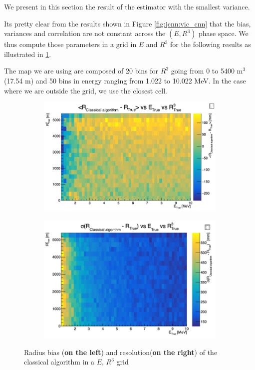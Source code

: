 \documentclass[../main.tex]{subfiles}
\begin{document}
We present in this section the result of the estimator with the smallest variance.

Its pretty clear from the results shown in Figure \ref{fig:jcnn:vic_cnn} that the bias, variances and correlation are not constant across the $(E, R^3)$ phase space. We thus compute those parameters in a grid in $E$ and $R^3$ for the following results as illustrated in \ref{fig:jcnn:vic_cnn:res_map}.

The map we are using are composed of 20 bins for $R^3$ going from 0 to 5400 m$^3$ (17.54 m) and 50 bins in energy ranging from 1.022 to 10.022 MeV. In the case where we are outside the grid, we use the closest cell.

\begin{figure}
  \centering
  \begin{subfigure}[t]{0.48\linewidth}
    \includegraphics[width=\linewidth]{images/jcnn/vic_cnn/vic_r_bias.png}
  \end{subfigure}
  \hfill
  \begin{subfigure}[t]{0.48\linewidth}
    \includegraphics[width=\linewidth]{images/jcnn/vic_cnn/vic_r_res.png}
  \end{subfigure}
  \caption{Radius bias (\textbf{on the left}) and resolution(\textbf{on the right}) of the classical algorithm in a $E$, $R^3$ grid}
  \label{fig:jcnn:vic_cnn:res_map}
\end{figure}
\end{document}
